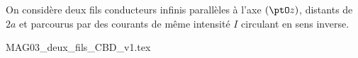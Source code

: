 \finEntrainement




\hauteurLargeurCadreReponse		{8mm}{2cm}
\initialisationEntrainement


\debutEntrainement

                                \initialisationPartieGauche %
On considère deux fils conducteurs infinis parallèles à l'axe $(\ptO z)$,
distants de $2a$ et parcourus par des courants de même intensité $I$ circulant en sens inverse.


                                \initialisationPartieDroite %
% 
\begin{center}
{MAG03_deux_fils_CBD_v1.tex}
\end{center}                                                          %
% 
                               \finalisationDuPartageDePage %


